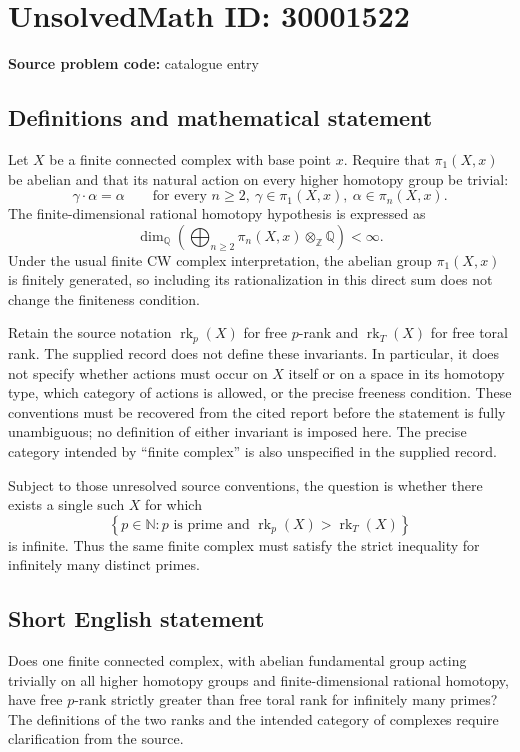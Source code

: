 \documentclass[11pt]{article}
\newcommand{\N}{\mathbb{N}}
\newcommand{\Z}{\mathbb{Z}}
\newcommand{\Q}{\mathbb{Q}}
\begin{document}
\section*{UnsolvedMath ID: 30001522}
\textbf{Source problem code:} catalogue entry
\subsection{Definitions and mathematical statement}
Let \(X\) be a finite connected complex with base point \(x\). Require that \(\pi_1(X,x)\) be abelian and that its natural action on every higher homotopy group be trivial:
\[
\gamma\cdot\alpha=\alpha
\qquad\text{for every }n\geq 2,\ \gamma\in\pi_1(X,x),\ \alpha\in\pi_n(X,x).
\]
The finite-dimensional rational homotopy hypothesis is expressed as
\[
\dim_{\Q}\left(\bigoplus_{n\geq 2}\pi_n(X,x)\otimes_{\Z}\Q\right)<\infty.
\]
Under the usual finite CW complex interpretation, the abelian group \(\pi_1(X,x)\) is finitely generated, so including its rationalization in this direct sum does not change the finiteness condition.

Retain the source notation \(\operatorname{rk}_p(X)\) for free \(p\)-rank and \(\operatorname{rk}_T(X)\) for free toral rank. The supplied record does not define these invariants. In particular, it does not specify whether actions must occur on \(X\) itself or on a space in its homotopy type, which category of actions is allowed, or the precise freeness condition. These conventions must be recovered from the cited report before the statement is fully unambiguous; no definition of either invariant is imposed here. The precise category intended by ``finite complex'' is also unspecified in the supplied record.

Subject to those unresolved source conventions, the question is whether there exists a single such \(X\) for which
\[
\left\{p\in\N : p\text{ is prime and }\operatorname{rk}_p(X)>\operatorname{rk}_T(X)\right\}
\]
is infinite. Thus the same finite complex must satisfy the strict inequality for infinitely many distinct primes.
\subsection{Short English statement}
Does one finite connected complex, with abelian fundamental group acting trivially on all higher homotopy groups and finite-dimensional rational homotopy, have free \(p\)-rank strictly greater than free toral rank for infinitely many primes? The definitions of the two ranks and the intended category of complexes require clarification from the source.
\end{document}
